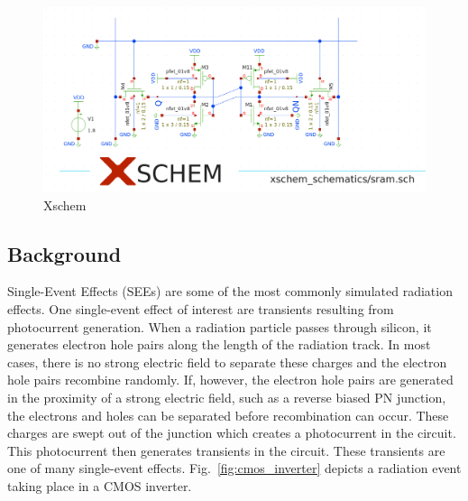 \documentclass[conference]{IEEEtran}
\begin{document}
        \begin{figure}[htbp]
        \centering
        \includegraphics[width=0.95\linewidth]{xschem_light}
        \caption{Xschem}
        \label{fig:interaction_diagram}
    \end{figure}

    \subsection{Background}\label{subsec:background}
    
   	Single-Event Effects (SEEs) are some of the most commonly simulated radiation effects. One single-event effect of interest are transients resulting from photocurrent generation. When a radiation particle passes through silicon, it generates electron hole pairs along the length of the radiation track. In most cases, there is no strong electric field to separate these charges and the electron hole pairs recombine randomly. If, however, the electron hole pairs are generated in the proximity of a strong electric field, such as a reverse biased PN junction, the electrons and holes can be separated before recombination can occur. These charges are swept out of the junction which creates a photocurrent in the circuit. This photocurrent then generates transients in the circuit. These transients are one of many single-event effects. Fig.~\ref{fig:cmos_inverter} depicts a radiation event taking place in a CMOS inverter.
    
\end{document}
